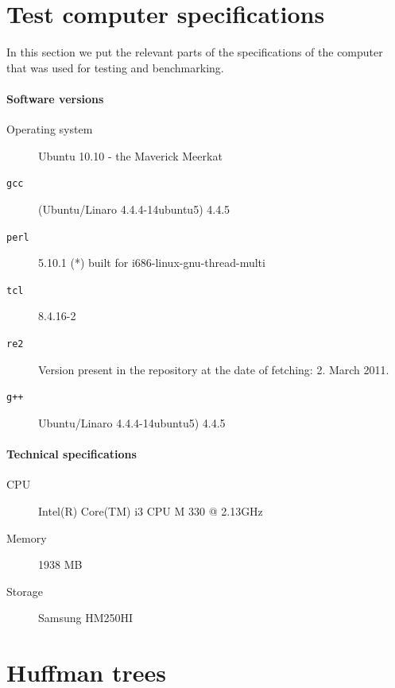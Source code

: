 \section{Test computer specifications}
\label{sec:specs}
In this section we put the relevant parts of the specifications of the
computer that was used for testing and benchmarking.

\paragraph{Software versions}

\begin{description}
\item[Operating system] Ubuntu 10.10 - the Maverick Meerkat
\item[\texttt{gcc}] (Ubuntu/Linaro 4.4.4-14ubuntu5) 4.4.5
\item[\texttt{perl}] 5.10.1 (*) built for i686-linux-gnu-thread-multi
\item[\texttt{tcl}] 8.4.16-2
\item[\texttt{re2}] Version present in the repository at the date of
  fetching: 2. March 2011.
\item[\texttt{g++}] Ubuntu/Linaro 4.4.4-14ubuntu5) 4.4.5
\end{description}


\paragraph{Technical specifications}
\begin{description}
\item[CPU] Intel(R) Core(TM) i3 CPU       M 330  @ 2.13GHz
\item[Memory] 1938 MB
\item[Storage] Samsung HM250HI
\end{description}



\section{Huffman trees}

